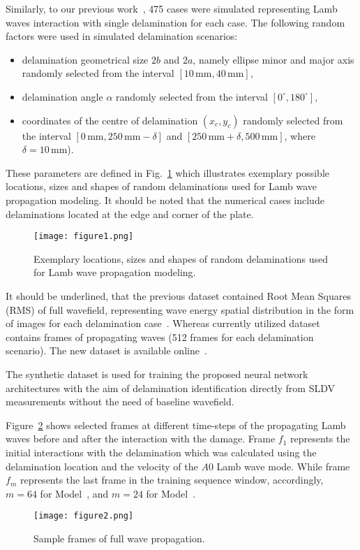 Similarly, to our previous work~\cite{Ijjeh2021}, 475 cases were simulated representing Lamb waves interaction with single delamination for each case. 
The following random factors were used in simulated delamination scenarios:
\begin{itemize}
	\item delamination geometrical size	\(2b\) and \(2a\), namely ellipse minor and major axis randomly selected from the interval \(\left[10 \, \textrm{mm}, 40\, \textrm{mm}\right]\),
	\item delamination angle \(\alpha\) randomly selected from the interval \( \left[ 0^{\circ}, 180^{\circ} \right]\),
	\item coordinates of the centre of delamination \((x_c,y_c)\) randomly selected from the interval \(\left[0\, \textrm{mm}, 250\, \textrm{mm} -\delta \right]\) and \( \left[250\, \textrm{mm}+\delta, 500\, \textrm{mm} \right] \), where \(\delta = 10\, \textrm{mm}\)).
\end{itemize}
These parameters are defined in Fig.~\ref{fig:random_delaminations} which illustrates exemplary possible locations, sizes and shapes of random delaminations used for Lamb wave propagation modeling.
It should be noted that the numerical cases include delaminations located at the edge and corner of the plate.
\begin{figure}[!h]
	\centering
	\texttt{[image: figure1.png]}
	\caption{Exemplary locations, sizes and shapes of random delaminations used for Lamb wave propagation modeling.}
	\label{fig:random_delaminations}
\end{figure}

It should be underlined, that the previous dataset contained Root Mean Squares (RMS) of full wavefield, representing wave energy spatial distribution in the form of images for each delamination case~\cite{Kudela2020d}. 
Whereas currently utilized dataset contains frames of propagating waves (512 frames for each delamination scenario). 
The new dataset is available online~\cite{kudela_pawel_2021_5414555}.

The synthetic dataset is used for training the proposed neural network architectures with the aim of delamination identification directly from SLDV measurements without the need of baseline wavefield.

Figure~\ref{fig:Full_wave} shows selected frames at different time-steps of the propagating Lamb waves before and after the interaction with the damage.
Frame \(f_{1}\) represents the initial interactions with the delamination which was calculated using the delamination location and the velocity of the \(A0\) Lamb wave mode.
While frame \(f_{m}\) represents the last frame in the training sequence window, accordingly, \(m=64\) for Model~, and \(m=24\) for Model~.
\begin{figure}[!h]
	\centering
	\texttt{[image: figure2.png]}
	\caption{Sample frames of full wave propagation.}
	\label{fig:Full_wave}
\end{figure}

